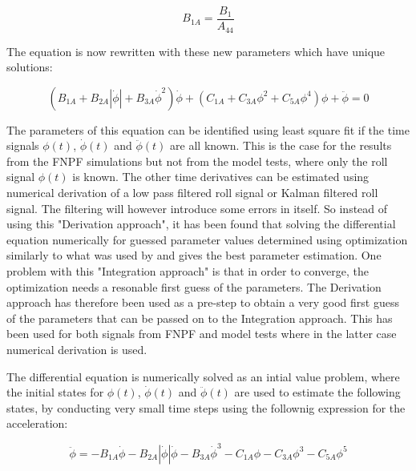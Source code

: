             
    
    \begin{equation}
B_{1A} = \frac{B_{1}}{A_{44}}
\label{eq:equation}
\end{equation}

    

    The equation is now rewritten with these new parameters which have
unique solutions:
 
            
    
    \begin{equation}
\left(B_{1A} + B_{2A} \left|{\dot{\phi}}\right| + B_{3A} \dot{\phi}^{2}\right) \dot{\phi} + \left(C_{1A} + C_{3A} \phi^{2} + C_{5A} \phi^{4}\right) \phi + \ddot{\phi} = 0
\label{eq:equation}
\end{equation}

    

    The parameters of this equation can be identified using least square fit
if the time signals \(\phi(t)\), \(\dot{\phi}(t)\) and
\(\ddot{\phi}(t)\) are all known. This is the case for the results from
the FNPF simulations but not from the model tests, where only the roll
signal \(\phi(t)\) is known. The other time derivatives can be estimated
using numerical derivation of a low pass filtered roll signal or Kalman
filtered roll signal. The filtering will however introduce some errors
in itself. So instead of using this "Derivation approach", it has been
found that solving the differential equation numerically for guessed
parameter values determined using optimization similarly to what was
used by \cite{7505983/FJHQJJUH} and \cite{7505983/9B7QMVJJ} gives the
best parameter estimation. One problem with this "Integration approach"
is that in order to converge, the optimization needs a resonable first
guess of the parameters. The Derivation approach has therefore been used
as a pre-step to obtain a very good first guess of the parameters that
can be passed on to the Integration approach. This has been used for
both signals from FNPF and model tests where in the latter case
numerical derivation is used.

The differential equation is numerically solved as an intial value
problem, where the initial states for \(\phi(t)\), \(\dot{\phi}(t)\) and
\(\ddot{\phi}(t)\) are used to estimate the following states, by
conducting very small time steps using the follownig expression for the
acceleration:
 
            
    
    \begin{equation}
\ddot{\phi} = - B_{1A} \dot{\phi} - B_{2A} \left|{\dot{\phi}}\right| \dot{\phi} - B_{3A} \dot{\phi}^{3} - C_{1A} \phi - C_{3A} \phi^{3} - C_{5A} \phi^{5}
\label{eq:equation}
\end{equation}

